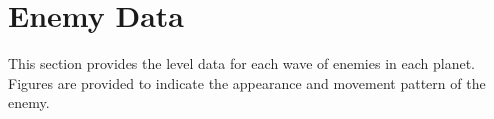 \chapter{Enemy Data}
This section provides the level data for each wave of enemies in each
planet. Figures are provided to indicate the appearance and movement
pattern of the enemy.



